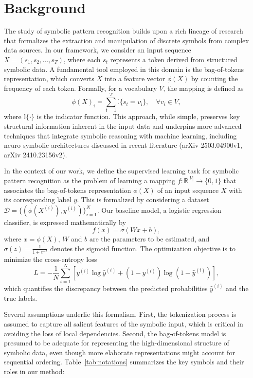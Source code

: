 \documentclass{article}
\begin{document}
\section{Background}
The study of symbolic pattern recognition builds upon a rich lineage of research that formalizes the extraction and manipulation of discrete symbols from complex data sources. In our framework, we consider an input sequence \( X = (s_1, s_2, \dots, s_T) \), where each \( s_t \) represents a token derived from structured symbolic data. A fundamental tool employed in this domain is the bag-of-tokens representation, which converts \( X \) into a feature vector \( \phi(X) \) by counting the frequency of each token. Formally, for a vocabulary \( V \), the mapping is defined as 
\[
\phi(X)_i = \sum_{t=1}^{T} \mathbb{I} \{ s_t = v_i \}, \quad \forall v_i \in V,
\]
where \(\mathbb{I}\{\cdot\}\) is the indicator function. This approach, while simple, preserves key structural information inherent in the input data and underpins more advanced techniques that integrate symbolic reasoning with machine learning, including neuro-symbolic architectures discussed in recent literature (arXiv 2503.04900v1, arXiv 2410.23156v2).

In the context of our work, we define the supervised learning task for symbolic pattern recognition as the problem of learning a mapping \( f: \mathbb{R}^{|V|} \to \{0,1\} \) that associates the bag-of-tokens representation \( \phi(X) \) of an input sequence \( X \) with its corresponding label \( y \). This is formalized by considering a dataset \(\mathcal{D} = \{(\phi(X^{(i)}), y^{(i)})\}_{i=1}^{N}\). Our baseline model, a logistic regression classifier, is expressed mathematically by
\[
f(x) = \sigma(Wx + b),
\]
where \(x = \phi(X)\), \(W\) and \(b\) are the parameters to be estimated, and \(\sigma(z) = \frac{1}{1+e^{-z}}\) denotes the sigmoid function. The optimization objective is to minimize the cross-entropy loss
\[
L = - \frac{1}{N}\sum_{i=1}^{N} \left[ y^{(i)} \log \hat{y}^{(i)} + (1-y^{(i)}) \log (1-\hat{y}^{(i)}) \right],
\]
which quantifies the discrepancy between the predicted probabilities \(\hat{y}^{(i)}\) and the true labels.

Several assumptions underlie this formalism. First, the tokenization process is assumed to capture all salient features of the symbolic input, which is critical in avoiding the loss of local dependencies. Second, the bag-of-tokens model is presumed to be adequate for representing the high-dimensional structure of symbolic data, even though more elaborate representations might account for sequential ordering. Table~\ref{tab:notations} summarizes the key symbols and their roles in our method:
\end{document}
